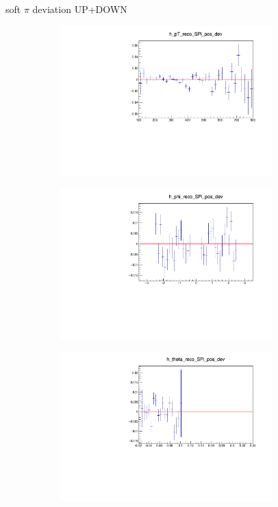 \documentclass[11pt]{beamer}
\begin{document}
\begin{frame}{soft $\pi$ deviation UP+DOWN}
\begin{figure}
\begin{subfigure}{0.45\textwidth}
\includegraphics[width=0.9\textwidth]{sec/up_plus_down_pdf/pT_2.pdf}
\end{subfigure}
\begin{subfigure}{0.45\textwidth}
\includegraphics[width=0.9\textwidth]{sec/up_plus_down_pdf/phi_2.pdf}
\end{subfigure}
\begin{subfigure}{0.45\textwidth}
\includegraphics[width=0.9\textwidth]{sec/up_plus_down_pdf/theta_2.pdf}

\end{subfigure}
\end{figure}
\end{frame}
\end{document}
